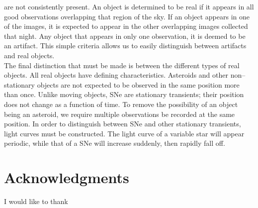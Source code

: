 \documentclass[aps,prb,twocolumn,superscriptaddress]{revtex4-1}
\begin{document}
are not consistently present.   
An object is determined to be real if it appears in all good 
observations overlapping that region of the sky.  
If an object appears in one of the images, it is expected to appear 
in the other overlapping images collected that night.  
Any object that appears in only one observation, it is deemed to be 
an artifact.  This simple criteria allows us to easily 
distinguish between artifacts and real objects.\\
%
\indent The final distinction that must be made is between the different 
types of real objects.  All real objects have defining characteristics.  
Asteroids and other non--stationary objects are not expected to be observed 
in the same position more than once.  Unlike moving objects, SNe are 
stationary transients; their position does not change as a function of time.  
To remove the possibility of an object being an asteroid, we require multiple 
observations be recorded at the same position.  In order to distinguish between 
SNe and other stationary transients, light curves must be constructed.  The light 
curve of a variable star will appear periodic, while that of a SNe will increase 
suddenly, then rapidly fall off.


\section*{Acknowledgments}
I would like to thank   %




\setlength{\parindent}{0cm}


\end{document}
